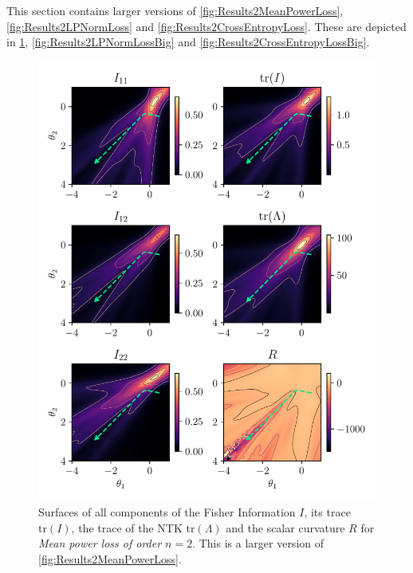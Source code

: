 This section contains larger versions of \cref{fig:Results2MeanPowerLoss}, \cref{fig:Results2LPNormLoss} and \cref{fig:Results2CrossEntropyLoss}. These are depicted in \cref{fig:Results2MeanPowerLossBig}, \cref{fig:Results2LPNormLossBig} and \cref{fig:Results2CrossEntropyLossBig}.
\begin{figure}
	\centering
	\includegraphics{Experiment2/plots/MeanPowerLoss2_tracecomparison_Big.pdf}
	\caption{Surfaces of all components of the Fisher Information $I$, its trace $\mathrm{tr}(I)$, the trace of the NTK $\mathrm{tr}(\Lambda)$ and the scalar curvature $R$ for \emph{Mean power loss of order $n=2$}. This is a larger version of \cref{fig:Results2MeanPowerLoss}.}
	\label{fig:Results2MeanPowerLossBig}
\end{figure}


